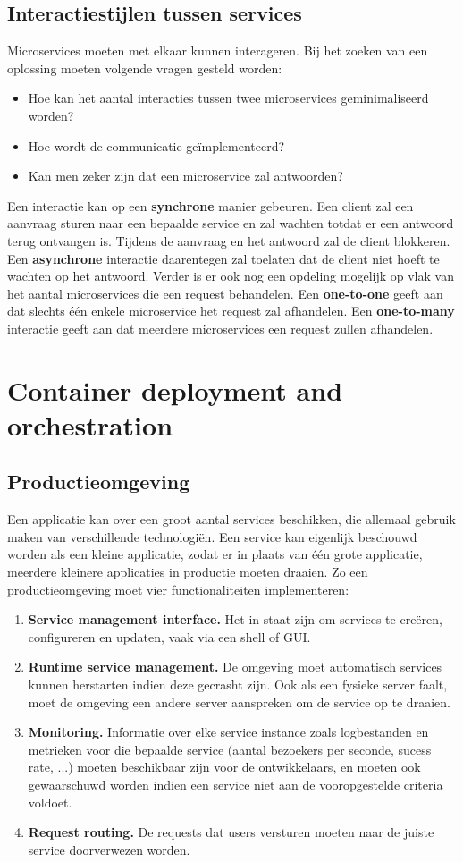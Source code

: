 \documentclass{report}
\begin{document}
	\chapter{Interactiestijlen tussen services}
	Microservices moeten met elkaar kunnen interageren. Bij het zoeken van een oplossing moeten volgende vragen gesteld worden:
	\begin{itemize}
		\item Hoe kan het aantal interacties tussen twee microservices geminimaliseerd worden?
		\item Hoe wordt de communicatie geïmplementeerd?
		\item Kan men zeker zijn dat een microservice zal antwoorden?
	\end{itemize}
	Een interactie kan op een \textbf{synchrone} manier gebeuren. Een client zal een aanvraag sturen naar een bepaalde service en zal wachten totdat er een antwoord terug ontvangen is. Tijdens de aanvraag en het antwoord zal de client blokkeren. Een \textbf{asynchrone} interactie daarentegen zal toelaten dat de client niet hoeft te wachten op het antwoord. Verder is er ook nog een opdeling mogelijk op vlak van het aantal microservices die een request behandelen. Een \textbf{one-to-one} geeft aan dat slechts één enkele microservice het request zal afhandelen. Een \textbf{one-to-many} interactie geeft aan dat meerdere microservices een request zullen afhandelen.
	
	\part{Container deployment and orchestration}
	\chapter{Productieomgeving}
	Een applicatie kan over een groot aantal services beschikken, die allemaal gebruik maken van verschillende technologiën. Een service kan eigenlijk beschouwd worden als een kleine applicatie, zodat er in plaats van één grote applicatie, meerdere kleinere applicaties in productie moeten draaien. Zo een productieomgeving moet vier functionaliteiten implementeren:
	\begin{enumerate}
		\item \textbf{Service management interface.} Het in staat zijn om services te creëren, configureren en updaten, vaak via een shell of GUI.
		\item \textbf{Runtime service management.} De omgeving moet automatisch services kunnen herstarten indien deze gecrasht zijn. Ook als een fysieke server faalt, moet de omgeving een andere server aanspreken om de service op te draaien.
		\item \textbf{Monitoring.} Informatie over elke service instance zoals logbestanden en metrieken voor die bepaalde service (aantal bezoekers per seconde, sucess rate, ...) moeten beschikbaar zijn voor de ontwikkelaars, en moeten ook gewaarschuwd worden indien een service niet aan de vooropgestelde criteria voldoet.  
		\item \textbf{Request routing.} De requests dat users versturen moeten naar de juiste service doorverwezen worden.
	\end{enumerate}
\end{document}
